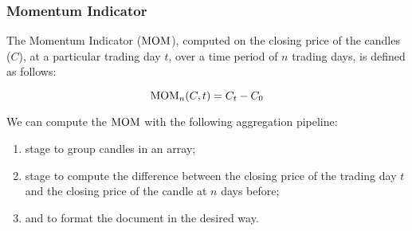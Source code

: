 \subsubsection{Momentum Indicator}

The Momentum Indicator (\(\operatorname{MOM}\)), computed on the closing price of the candles
(\(C\)), at a particular trading day \(t\), over a time period of \(n\) trading
days, is defined as follows:

\begin{equation}\label{eq:mom}
	\operatorname{MOM}_n(C,t) = C_t - C_0
\end{equation}

We can compute the \(\operatorname{MOM}\) with the following aggregation pipeline:

\begin{enumerate}
	\item {} stage to group candles in an array;
	\item {} stage to compute the difference between the
		closing price of the trading day \(t\) and the closing price of
		the candle at \(n\) days before;
	\item {} and  to format the document
		in the desired way.
\end{enumerate}
